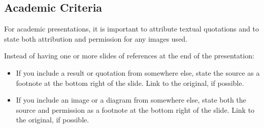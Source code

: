 \subsection{Academic Criteria}

For academic presentations, it is important to attribute textual
quotations and to state both attribution and permission for any
images used.

Instead of having one or more slides of references at the end of the
presentation:
\begin{itemize}
\item If you include a result or quotation from somewhere else, state
  the source as a footnote at the bottom right of the slide.  Link to
  the original, if possible.

\item If you include an image or a diagram from somewhere else, state
  both the source and permission as a footnote at the bottom right of
  the slide. Link to the original, if possible.
\end{itemize}


